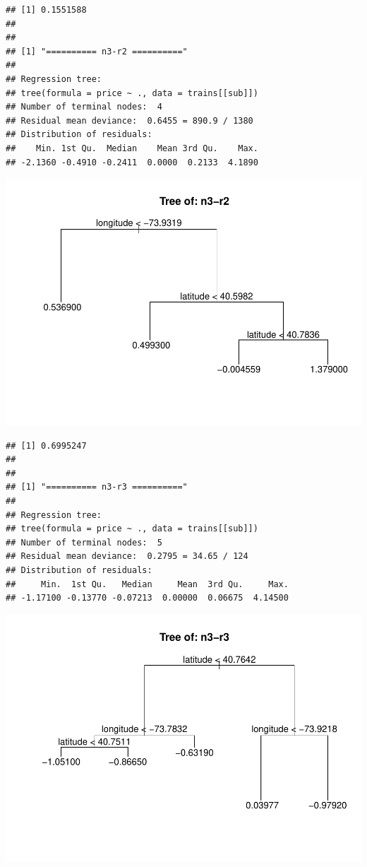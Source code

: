 \documentclass[
]{article}
\begin{document}
\begin{verbatim}
## [1] 0.1551588
## 
## 
## [1] "========== n3-r2 =========="
## 
## Regression tree:
## tree(formula = price ~ ., data = trains[[sub]])
## Number of terminal nodes:  4 
## Residual mean deviance:  0.6455 = 890.9 / 1380 
## Distribution of residuals:
##    Min. 1st Qu.  Median    Mean 3rd Qu.    Max. 
## -2.1360 -0.4910 -0.2411  0.0000  0.2133  4.1890
\end{verbatim}

\includegraphics{project-code_files/figure-latex/unnamed-chunk-14-13.pdf}

\begin{verbatim}
## [1] 0.6995247
## 
## 
## [1] "========== n3-r3 =========="
## 
## Regression tree:
## tree(formula = price ~ ., data = trains[[sub]])
## Number of terminal nodes:  5 
## Residual mean deviance:  0.2795 = 34.65 / 124 
## Distribution of residuals:
##     Min.  1st Qu.   Median     Mean  3rd Qu.     Max. 
## -1.17100 -0.13770 -0.07213  0.00000  0.06675  4.14500
\end{verbatim}

\includegraphics{project-code_files/figure-latex/unnamed-chunk-14-14.pdf}
\end{document}
